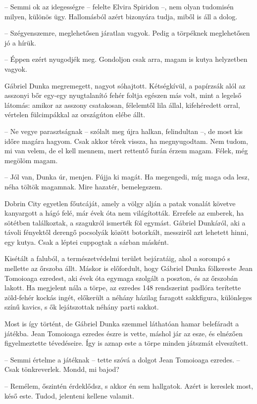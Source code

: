 \documentclass{IEEEtran}
\begin{document}
– Semmi ok az idegességre – felelte Elvira Spiridon –, nem olyan tudomisén
milyen, különös ügy. Hallomásból azért bizonyára tudja, miből is áll a dolog.

– Szégyenszemre, meglehetősen járatlan vagyok. Pedig a törpéknek meglehetősen
jó a hírük.

– Éppen ezért nyugodjék meg. Gondoljon csak arra, magam is kutya helyzetben
vagyok.

Gábriel Dunka megremegett, nagyot sóhajtott. Kétségkívül, a papírzsák alól az
asszonyi bőr egy-egy nyugtalanító fehér foltja egészen más volt, mint a
legelső látomás: amikor az asszony csatakosan, félelemtől lila állal,
kifehéredett orral, vértelen fülcimpákkal az országúton elébe állt.

– Ne vegye parasztságnak – szólalt meg újra halkan, felindultan –, de most kis
időre magára hagyom. Csak akkor térek vissza, ha megnyugodtam. Nem tudom, mi
van velem, de el kell mennem, mert rettentő furán érzem magam. Félek, még
megölöm magam.

– Jól van, Dunka úr, menjen. Fújja ki magát. Ha megengedi, míg maga oda lesz,
néha töltök magamnak. Mire hazatér, bemelegszem.

Dobrin City egyetlen főutcáját, amely a völgy alján a patak vonalát követve
kanyargott a hágó felé, már évek óta nem világították. Errefele az emberek, ha
sötétben találkoztak, a szagukról ismerték föl egymást. Gábriel Dunkáról, aki
a távoli fényektől derengő pocsolyák között botorkált, messziről azt lehetett
hinni, egy kutya. Csak a léptei cuppogtak a sárban másként.

Kisétált a faluból, a természetvédelmi terület bejáratáig, ahol a sorompó s
mellette az őrszoba állt. Máskor is előfordult, hogy Gábriel Dunka fölkereste
Jean Tomoioaga ezredest, aki évek óta egymaga szolgált a poszton, és az
őrszobán lakott. Ha megjelent nála a törpe, az ezredes 148 rendszerint padlóra
terítette zöld-fehér kockás ingét, előkerült a néhány házilag faragott
sakkfigura, különleges színű kavics, s ők lejátszottak néhány parti sakkot.

Most is így történt, de Gábriel Dunka szemmel láthatóan hamar belefáradt a
játékba. Jean Tomoioaga ezredes észre is vette, máshol jár az esze, és
elnézően figyelmeztette tévedéseire. Így is aznap este a törpe minden játszmát
elveszített.

– Semmi értelme a játéknak – tette szóvá a dolgot Jean Tomoioaga ezredes. –
Csak tönkreverlek. Mondd, mi bajod?

– Remélem, őszintén érdeklődsz, s akkor én sem hallgatok. Azért is kereslek
most, késő este. Tudod, jelenteni kellene valamit.
\end{document}
